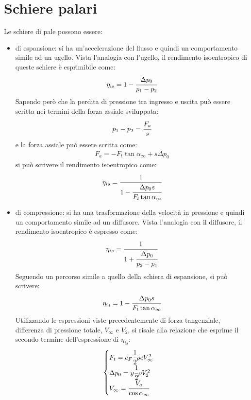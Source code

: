 \section{Schiere palari}
Le schiere di pale possono essere:
\begin{itemize}
	\item di espansione: si ha un'accelerazione del flusso e quindi un comportamento simile ad un ugello. Vista l'analogia con l'ugello, il rendimento isoentropico di queste schiere è esprimibile come:
	\begin{align*}
	\eta_{is} = 1- \cfrac{\Delta p_0}{p_1 - p_2}
	\end{align*}
	Sapendo però che la perdita di pressione tra ingresso e uscita può essere scritta nei termini della forza assiale sviluppata:
	\begin{align*}
	p_1-p_2 = \cfrac{F_a}{s}
	\end{align*}
	e la forza assiale può essere scritta come:
	\begin{align*}
	F_a=  - F_t \tan \alpha_{\infty} + s \Delta p_0
	\end{align*}
	si può scrivere il rendimento isoentropico come:
	\begin{align*}
	\eta_{is} = \cfrac{1}{1- \cfrac{\Delta p_0 s}{F_t \tan \alpha_{\infty}}}
	\end{align*}
	\item  di compressione: si ha una trasformazione della velocità in pressione e quindi un comportamento simile ad un diffusore. Vista l'analogia con il diffusore, il rendimento isoentropico è espresso come:
	\begin{align*}
	\eta_{is} = \cfrac{1}{1 + \cfrac{\Delta p_0}{p_2-p_1}}
	\end{align*}
	Seguendo un percorso simile a quello della schiera di espansione, si può scrivere:
	\begin{align*}
	\eta_{is} = 1- \cfrac{\Delta p_0 s}{F_t \tan \alpha_{\infty}}
	\end{align*}
	Utilizzando le espressioni viste precedentemente di forza tangenziale, differenza di pressione totale, $V_\infty$ e $V_2$, si risale alla relazione che esprime il secondo termine dell'espressione di $\eta_{is}$:
	\begin{align*}
	\begin{cases}
	F_t = c_F \cfrac{1}{2} \rho c V_{\infty}^2\\
	\Delta p_0 = y \cfrac{1}{2} \rho V_2^2\\
	V_{\infty} = \cfrac{V_a}{\cos \alpha_{\infty}}\\

\end{cases}
\end{align*}
\end{itemize}
